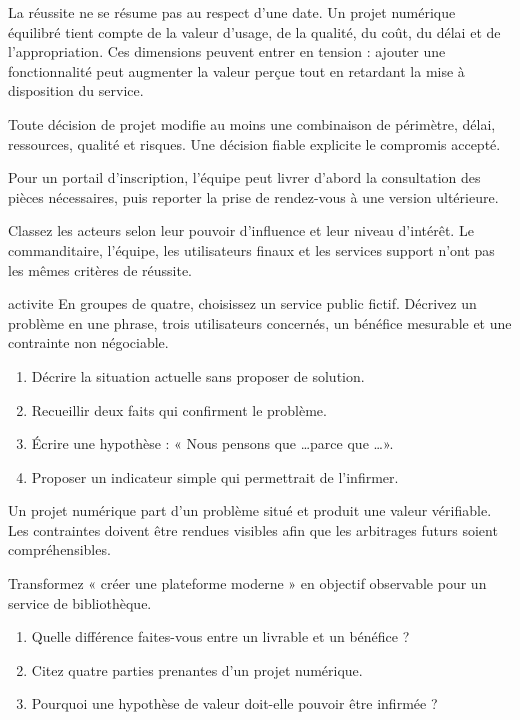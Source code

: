 \documentclass[12pt,twoside]{upbcours}
\begin{document}
La réussite ne se résume pas au respect d'une date. Un projet numérique équilibré tient compte de
la valeur d'usage, de la qualité, du coût, du délai et de l'appropriation. Ces dimensions peuvent
entrer en tension : ajouter une fonctionnalité peut augmenter la valeur perçue tout en retardant
la mise à disposition du service.
\begin{theoreme}
  Toute décision de projet modifie au moins une combinaison de périmètre, délai, ressources,
  qualité et risques. Une décision fiable explicite le compromis accepté.
\end{theoreme}
\begin{exemple}
  Pour un portail d'inscription, l'équipe peut livrer d'abord la consultation des pièces
  nécessaires, puis reporter la prise de rendez-vous à une version ultérieure.
\end{exemple}
Classez les acteurs selon leur pouvoir d'influence et leur niveau d'intérêt. Le commanditaire,
l'équipe, les utilisateurs finaux et les services support n'ont pas les mêmes critères de réussite.
\begin{icone}{activite}
  En groupes de quatre, choisissez un service public fictif. Décrivez un problème en une phrase,
  trois utilisateurs concernés, un bénéfice mesurable et une contrainte non négociable.
\end{icone}
\begin{enumerate}
  \item Décrire la situation actuelle sans proposer de solution.
  \item Recueillir deux faits qui confirment le problème.
  \item Écrire une hypothèse : « Nous pensons que \ldots parce que \ldots ».
  \item Proposer un indicateur simple qui permettrait de l'infirmer.
\end{enumerate}
\begin{resumechapitre}
  Un projet numérique part d'un problème situé et produit une valeur vérifiable. Les contraintes
  doivent être rendues visibles afin que les arbitrages futurs soient compréhensibles.
\end{resumechapitre}
\begin{evalformative}
  Transformez « créer une plateforme moderne » en objectif observable pour un service de bibliothèque.
\end{evalformative}
\begin{autoevaluation}
  \begin{enumerate}
    \item Quelle différence faites-vous entre un livrable et un bénéfice ?
    \item Citez quatre parties prenantes d'un projet numérique.
    \item Pourquoi une hypothèse de valeur doit-elle pouvoir être infirmée ?
  \end{enumerate}
\end{autoevaluation}
\end{document}
